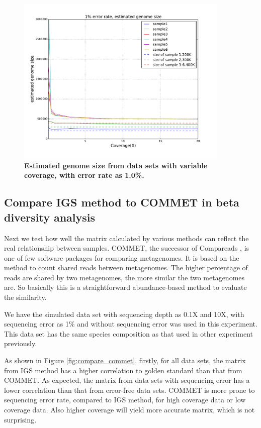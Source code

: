 \begin{figure}[!ht]
 \centerline{\includegraphics[width=4in]{./figures/alpha_by_coverage_001e.pdf}}
\caption{\bf Estimated genome size from data sets with variable coverage, with
error rate as 1.0\%. }
\label{fig:alpha_by_coverage_001e}
\end{figure}


\subsection{Compare IGS method to COMMET in beta diversity analysis}


Next we test how well the matrix calculated by various methods can reflect the
real relationship between samples. COMMET\cite{DBLP:conf/bibm/MailletCVLP14}, 
the successor of Compareads \cite{Maillet2012}, is one
of few software packages for comparing metagenomes. It is based on the method to
count shared reads between metagenomes. The higher percentage of reads are
shared by two metagenomes, the more similar the two metagenomes are. So
basically this is a straightforward abundance-based method to evaluate the
similarity.

We have the simulated data set with sequencing depth as 0.1X and 10X, with 
sequencing error as 1\% and without sequencing error was used in this experiment.
This data set has the same species composition as that used in other experiment previously.

As shown in Figure \ref{fig:compare_commet}, firstly, for 
all data sets, the matrix from IGS method has a higher 
correlation to golden standard than that from COMMET.  As expected, 
the matrix from data sets with sequencing error has a lower correlation 
than that from error-free
data sets. COMMET is more prone to sequencing error rate, compared to 
IGS method, for high coverage data or low coverage data.
Also higher coverage will yield more accurate matrix, which is not surprising.


